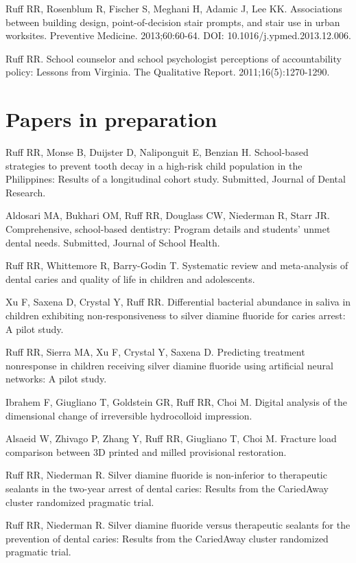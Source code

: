 \documentclass[margin,line]{res}
\begin{document}
\begin{resume}
Ruff RR, Rosenblum R, Fischer S, Meghani H, Adamic J, Lee KK. Associations between building design, point-of-decision stair prompts, and stair use in urban worksites. Preventive Medicine. 2013;60:60-64. DOI: 10.1016/j.ypmed.2013.12.006.

Ruff RR. School counselor and school psychologist perceptions of accountability policy: Lessons from Virginia. The Qualitative Report. 2011;16(5):1270-1290.



\section{\sc Papers in preparation}
Ruff RR, Monse B, Duijster D, Naliponguit E, Benzian H. School-based strategies to
prevent tooth decay in a high-risk child population in the Philippines: Results of a longitudinal cohort study. Submitted, Journal of Dental Research.

Aldosari MA, Bukhari OM, Ruff RR, Douglass CW, Niederman R, Starr JR. Comprehensive, school-based dentistry: Program details and students’ unmet dental needs. Submitted, Journal of School Health.

Ruff RR, Whittemore R, Barry-Godin T. Systematic review and meta-analysis of dental
caries and quality of life in children and adolescents.

Xu F, Saxena D, Crystal Y, Ruff RR. Differential bacterial abundance in saliva in children exhibiting non-responsiveness to silver diamine fluoride for caries arrest: A pilot study.

Ruff RR, Sierra MA, Xu F, Crystal Y, Saxena D. Predicting treatment nonresponse in children receiving silver diamine fluoride using artificial neural networks: A pilot study.

Ibrahem F, Giugliano T, Goldstein GR, Ruff RR, Choi M. Digital analysis of the dimensional change of irreversible hydrocolloid impression.

Alsaeid W, Zhivago P, Zhang Y, Ruff RR, Giugliano T, Choi M. Fracture load comparison between 3D printed and milled provisional restoration.

Ruff RR, Niederman R. Silver diamine fluoride is non-inferior to therapeutic sealants in the two-year arrest of dental caries: Results from the CariedAway cluster randomized pragmatic trial.

Ruff RR, Niederman R. Silver diamine fluoride versus therapeutic sealants for the prevention of dental caries: Results from the CariedAway cluster randomized pragmatic trial.


\end{resume}
\end{document}
